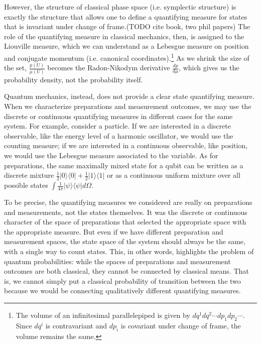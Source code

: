\documentclass[10pt,twocolumn, nofootinbib]{revtex4-2}
\def\>{\rangle}
\def\<{\langle}
\begin{document}
However, the structure of classical phase space (i.e. symplectic structure) is exactly the structure that allows one to define a quantifying measure for states that is invariant under change of frame.(TODO cite book, two phil papers) The role of the quantifying measure in classical mechanics, then, is assigned to the Liouville measure, which we can understand as a Lebesgue measure on position and conjugate momentum (i.e. canonical coordinates).\footnote{The volume of an infinitesimal parallelepiped is given by $dq^1 dq^2 \cdots dp_1 dp_2 \cdots$. Since $dq^i$ is contravariant and $dp_i$ is covariant under change of frame, the volume remains the same.} As we shrink the size of the set, $\frac{p(U)}{\mu(U)}$ becomes the Radon-Nikodym derivative $\frac{dp}{d\mu}$, which gives us the probability density, not the probability itself.


Quantum mechanics, instead, does not provide a clear state quantifying measure. When we characterize preparations and measurement outcomes, we may use the discrete or continuous quantifying measures in different cases for the same system. For example, consider a particle. If we are interested in a discrete observable, like the energy level of a harmonic oscillator, we would use the counting measure; if we are interested in a continuous observable, like position, we would use the Lebesgue measure associated to the variable. As for preparations, the same maximally mixed state for a qubit can be written as a discrete mixture $\frac{1}{2} | 0 \> \< 0 | + \frac{1}{2} | 1 \> \< 1 | $ or as a continuous uniform mixture over all possible states $\int \frac{1}{4\pi} | \psi \> \< \psi | d\Omega$.

To be precise, the quantifying measures we considered are really on preparations and measurements, not the states themselves. It was the discrete or continuous character of the space of preparations that selected the appropriate space with the appropriate measure. But even if we have different preparation and measurement spaces, the state space of the system should always be the same, with a single way to count states. This, in other words, highlights the problem of quantum probabilities: while the spaces of preparations and measurement outcomes are both classical, they cannot be connected by classical means. That is, we cannot simply put a classical probability of transition between the two because we would be connecting qualitatively different quantifying measures.
\end{document}
